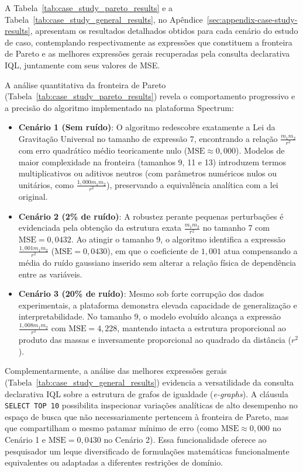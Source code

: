A Tabela~\ref{tab:case_study_pareto_results} e a Tabela~\ref{tab:case_study_general_results}, no Apêndice~\ref{sec:appendix-case-study-results}, apresentam os resultados detalhados obtidos para cada cenário do estudo de caso, contemplando respectivamente as expressões que constituem a fronteira de Pareto e as melhores expressões gerais recuperadas pela consulta declarativa IQL, juntamente com seus valores de MSE.

A análise quantitativa da fronteira de Pareto (Tabela~\ref{tab:case_study_pareto_results}) revela o comportamento progressivo e a precisão do algoritmo implementado na plataforma Spectrum:

\begin{itemize}
    \item \textbf{Cenário 1 (Sem ruído)}: O algoritmo redescobre exatamente a Lei da Gravitação Universal no tamanho de expressão 7, encontrando a relação $\frac{m_1 m_2}{r^2}$ com erro quadrático médio teoricamente nulo ($\text{MSE} \approx 0{,}000$). Modelos de maior complexidade na fronteira (tamanhos 9, 11 e 13) introduzem termos multiplicativos ou aditivos neutros (com parâmetros numéricos nulos ou unitários, como $\frac{1{,}000 m_1 m_2}{r^2}$), preservando a equivalência analítica com a lei original.
    \item \textbf{Cenário 2 (2\% de ruído)}: A robustez perante pequenas perturbações é evidenciada pela obtenção da estrutura exata $\frac{m_1 m_2}{r^2}$ no tamanho 7 com $\text{MSE} = 0{,}0432$. Ao atingir o tamanho 9, o algoritmo identifica a expressão $\frac{1{,}001 m_1 m_2}{r^2}$ ($\text{MSE} = 0{,}0430$), em que o coeficiente de $1{,}001$ atua compensando a média do ruído gaussiano inserido sem alterar a relação física de dependência entre as variáveis.
    \item \textbf{Cenário 3 (20\% de ruído)}: Mesmo sob forte corrupção dos dados experimentais, a plataforma demonstra elevada capacidade de generalização e interpretabilidade. No tamanho 9, o modelo evoluído alcança a expressão $\frac{1{,}008 m_1 m_2}{r^2}$ com $\text{MSE} = 4{,}228$, mantendo intacta a estrutura proporcional ao produto das massas e inversamente proporcional ao quadrado da distância ($r^2$).
\end{itemize}

Complementarmente, a análise das melhores expressões gerais (Tabela~\ref{tab:case_study_general_results}) evidencia a versatilidade da consulta declarativa IQL sobre a estrutura de grafos de igualdade (\textit{e-graphs}). A cláusula \texttt{SELECT TOP 10} possibilita inspecionar variações analíticas de alto desempenho no espaço de busca que não necessariamente pertencem à fronteira de Pareto, mas que compartilham o mesmo patamar mínimo de erro (como $\text{MSE} \approx 0{,}000$ no Cenário 1 e $\text{MSE} = 0{,}0430$ no Cenário 2). Essa funcionalidade oferece ao pesquisador um leque diversificado de formulações matemáticas funcionalmente equivalentes ou adaptadas a diferentes restrições de domínio.

